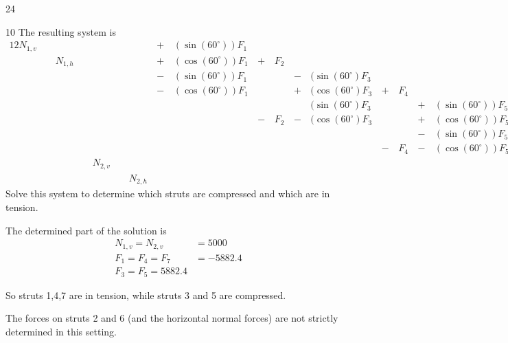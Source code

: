 \begin{applicationActivities}{2}{4}
\begin{activity}{10}
\drawtruss[0.8]
The resulting system is 
\begin{alignat*}{12}
N_{1,v} &\,\,& &\,\,& &\,\,& &\,+\,& (\sin(60^\circ))F_1 &\,\,& &\,\,& &\,\,& &\,\,& &\,\,& &\,\,& &\,=\,& 0 \\
        &\,\,& N_{1,h} &\,\,& &\,\,& &\,+\,& (\cos(60^\circ))F_1 &\,+\,&F_2 &\,\,& &\,\,& &\,\,& &\,\,& &\,\,& &\,=\,& 0 \\
        &\,\,&         &\,\,& &\,\,& &\,-\,& (\sin(60^\circ))F_1 &\,\,& &\,-\,&(\sin(60^\circ)F_3 &\,\,& &\,\,& &\,\,& &\,\,& &\,=\,& 0 \\
        &\,\,&         &\,\,& &\,\,& &\,-\,& (\cos(60^\circ))F_1 &\,\,& &\,+\,&(\cos(60^\circ)F_3 &\,+\,&F_4 &\,\,& &\,\,& &\,\,& &\,=\,& 0 \\
        &\,\,&         &\,\,& &\,\,& &\,\,&                     &\,\,& &\,\,&(\sin(60^\circ)F_3 &\,\,& &\,+\,& (\sin(60^\circ))F_5&\,\,& &\,\,& &\,=\,& 10000 \\
        &\,\,&         &\,\,& &\,\,& &\,\,&                     &\,-\,& F_2&\,-\,&(\cos(60^\circ)F_3 &\,\,& &\,+\,& (\cos(60^\circ))F_5&\,+\,&F_6 &\,\,& &\,=\,& 0 \\
        &\,\,&         &\,\,& &\,\,& &\,\,&                     &\,\,& &\,\,&                   &\,\,& &\,-\,& (\sin(60^\circ))F_5&\,\,& &\,-\,& (\sin(60^\circ))F_7&\,=\,& 0 \\
        &\,\,&         &\,\,& &\,\,& &\,\,&                     &\,\,& &\,\,&                   &\,-\,&F_4 &\,-\,& (\cos(60^\circ))F_5&\,\,& &\,+\,& (\cos(60^\circ))F_7&\,=\,& 0 \\
        &\,\,&         &\,\,& N_{2,v} &\,\,& &\,\,&                     &\,\,& &\,\,&                   &\,\,& &\,\,&                    &\,\,& &\,+\,& (\sin(60^\circ))F_7&\,=\,& 0 \\
        &\,\,&         &\,\,& &\,\,&N_{2,h} &\,\,&                     &\,\,& &\,\,&                   &\,\,&    &\,\,&                    &\,-\,& F_6 &\,-\,& (\cos(60^\circ))F_7&\,=\,& 0 
\end{alignat*}
Solve this system to determine which struts are compressed and which are in tension.
\end{activity}

\begin{observation}
The determined part of the solution is
\begin{align*}
N_{1,v}=N_{2,v}&=5000 \\
F_1=F_4=F_7&=-5882.4 \\
F_3=F_5=5882.4
\end{align*}

So struts 1,4,7 are in tension, while struts 3 and 5 are compressed.

The forces on struts 2 and 6 (and the horizontal normal forces) are not strictly determined in this setting.
\end{observation}

\end{applicationActivities}

